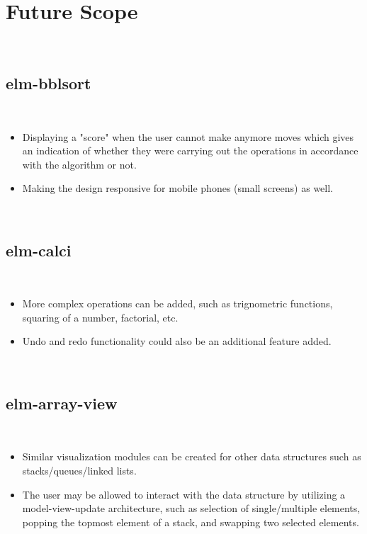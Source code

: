 \cleardoublepage

\section{Future Scope}
\\[1in]
\begin{FlushLeft}
\subsection{elm-bblsort}
\\[0.1in]
\begin{itemize}
    \item Displaying a "score" when the user cannot make anymore moves which gives an indication of whether they were carrying out the operations in accordance with the algorithm or not. 
    \item Making the design responsive for mobile phones (small screens) as well. 
\end{itemize}
\\[0.5in]
\subsection{elm-calci}
\\[0.1in]
\begin{itemize}
    \item More complex operations can be added, such as trignometric functions, squaring of a number, factorial, etc. 
    \item Undo and redo functionality could also be an additional feature added.
\end{itemize}
\\[0.5in]
\subsection{elm-array-view}
\\[0.1in]
\begin{itemize}
    \item Similar visualization modules can be created for other data structures such as stacks/queues/linked lists. 
    \item The user may be allowed to interact with the data structure by utilizing a model-view-update architecture, such as selection of single/multiple elements, popping the topmost element of a stack, and swapping two selected elements. 
\end{itemize}
\end{FlushLeft}